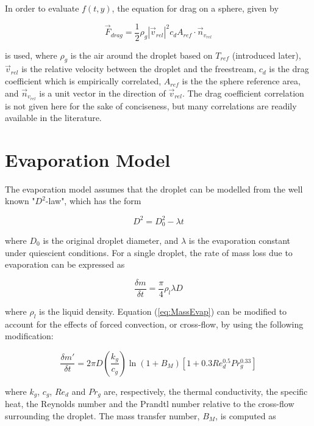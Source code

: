 \documentclass[12pt]{article}
\begin{document}
In order to evaluate $f(t, y)$, the equation for drag on a sphere, given by

\begin{equation}
\vec{F}_{drag} = \frac{1}{2}\rho_{g} |\vec{v}_{rel}|^{2}c_{d}A_{ref} \cdot \vec{n}_{v_{rel}}
\end{equation}

is used, where $\rho_{g}$ is the air around the droplet based on $T_{ref}$ (introduced later), $\vec{v}_{rel}$ is the relative velocity between the droplet and the freestream, $c_{d}$ is the drag coefficient which is empirically correlated, $A_{ref}$ is the the sphere reference area, and $\vec{n}_{v_{rel}}$ is a unit vector in the direction of $\vec{v}_{rel}$. The drag coefficient correlation is not given here for the sake of conciseness, but many correlations are readily available in the literature.

\section{Evaporation Model}\label{sec:EvapModel}

The evaporation model assumes that the droplet can be modelled from the well known "$D^{2}$-law", which has the form \cite{Sazhin2014}

\begin{equation}\label{eq:DSquaredLaw}
D^{2} = D_{0}^{2} - \lambda t
\end{equation}

where $D_{0}$ is the original droplet diameter, and $\lambda$ is the evaporation constant under quiescient conditions. For a single droplet, the rate of mass loss due to evaporation can be expressed as

\begin{equation}\label{eq:MassEvap}
\frac{\delta m}{\delta t} = \frac{\pi}{4} \rho_{l} \lambda D
\end{equation}

where $\rho_{l}$ is the liquid density. Equation (\ref{eq:MassEvap}) can be modified to account for the effects of forced convection, or cross-flow, by using the following modification:

\begin{equation}
\frac{\delta m'}{\delta t} = 2 \pi D \left(\frac{k_{g}}{c_{g}}\right)\ln(1 + B_{M})\left[1 + 0.3Re_{d}^{0.5}Pr_{g}^{0.33}\right]
\end{equation}

where $k_{g}$, $c_{g}$, $Re_{d}$ and $Pr_{g}$ are, respectively, the thermal conductivity, the specific heat, the Reynolds number and the Prandtl number relative to the cross-flow surrounding the droplet. The mass transfer number, $B_{M}$, is computed as
\end{document}
